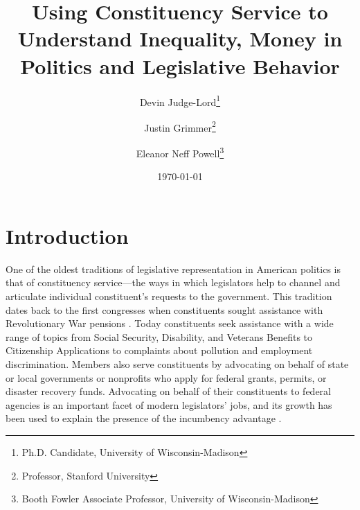 \documentclass{article}
\title{Using Constituency Service to Understand Inequality, Money in Politics and Legislative Behavior}
\author{Devin Judge-Lord\thanks{Ph.D. Candidate, University of Wisconsin-Madison}\and Justin Grimmer\thanks{Professor, Stanford University} \and Eleanor Neff Powell\thanks{Booth Fowler Associate Professor, University of Wisconsin-Madison}}
\date{\today}
\begin{document}



\doublespacing
\section{Introduction}
One of the oldest traditions of legislative representation in American politics is that of constituency service---the ways in which legislators help to channel and articulate individual constituent's requests to the government.  This tradition dates back to the first congresses when constituents sought assistance with Revolutionary War pensions \citep{Eckman2017}. Today constituents seek assistance with a wide range of topics from Social Security, Disability, and Veterans Benefits to Citizenship Applications to complaints about pollution and employment discrimination. Members also serve constituents by advocating on behalf of state or local governments or nonprofits who apply for federal grants, permits, or disaster recovery funds. %
Advocating on behalf of their constituents to federal agencies is an important facet of modern legislators' jobs, and its growth has been used to explain the presence of the incumbency advantage \citep{King1991}.  
\end{document}
